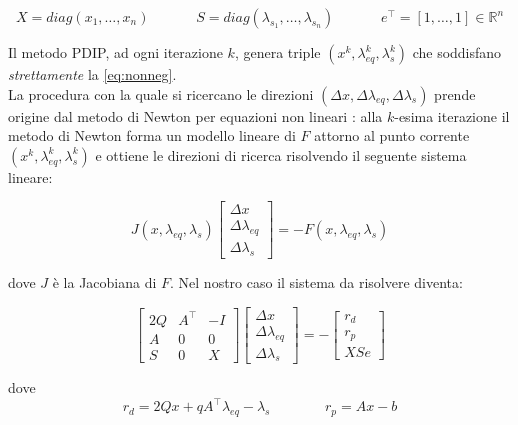 \begin{equation} \label{eq:xs}
    X = diag(x_1, \dots, x_n) \;\;\;\;\;\;\;\;\;\;\;\; 
    S = diag(\lambda_{s_1}, \dots, \lambda_{s_n}) \;\;\;\;\;\;\;\;\;\;\;\; 
    e^\intercal = [1, \dots, 1] \in \mathbb{R}^n
\end{equation}

Il metodo PDIP, ad ogni iterazione $k$, genera triple $(x^k, \lambda_{eq}^k, \lambda_{s}^k)$ 
che soddisfano \emph{strettamente} la \ref{eq:nonneg}.\\
La procedura con la quale si ricercano le direzioni $(\Delta x, \Delta \lambda_{eq}, \Delta \lambda_s)$ 
prende origine dal metodo di Newton per equazioni non lineari \cite{Nocedal2006Numerical}: 
alla $k$-esima iterazione il metodo di Newton forma un modello lineare di $F$ 
attorno al punto corrente $(x^k, \lambda_{eq}^k, \lambda_{s}^k)$ e ottiene 
le direzioni di ricerca risolvendo il seguente sistema lineare:

\begin{equation} \label{eq:J}
J(x, \lambda_{eq}, \lambda_s) \begin{bmatrix}
\Delta x \\ \Delta \lambda_{eq}\\ \Delta \lambda_s
\end{bmatrix} = -F(x, \lambda_{eq}, \lambda_{s})
\end{equation}

dove $J$ è la Jacobiana di $F$. Nel nostro caso il sistema da risolvere diventa:

\begin{equation} \label{eq:defKKT}
\begin{bmatrix}
2Q & A^\intercal & -I\\
A & 0 & 0 \\
S & 0 & X
\end{bmatrix}\begin{bmatrix}\Delta x \\ \Delta \lambda_{eq} \\ \Delta \lambda_{s} \end{bmatrix}= -
\begin{bmatrix}
    r_d\\r_p\\XSe
\end{bmatrix}
\end{equation}

dove
\begin{equation} \label{eq:res}
    r_d=2Qx +q A^\intercal \lambda_{eq} -\lambda_s \;\;\;\;\;\;\;\;\;\;\;\;\;\; r_p=Ax-b
\end{equation}


